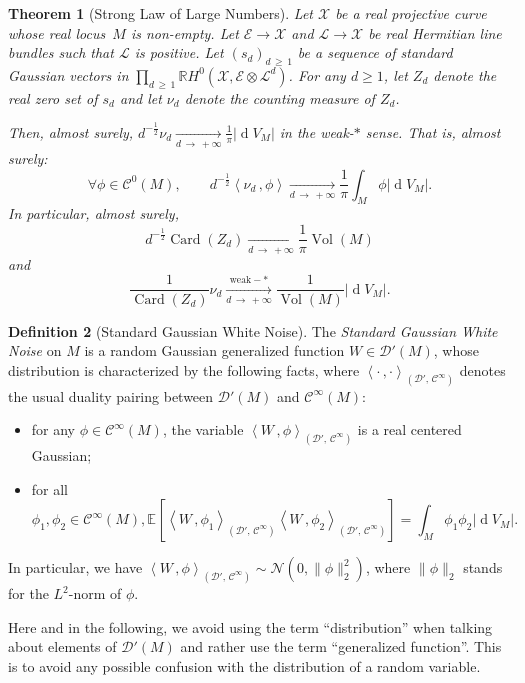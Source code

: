 \documentclass[10pt]{amsart}
\newtheorem{theo}{Theorem}[section]
\theoremstyle{definition}\newtheorem{defi}[theo]{Definition}\newtheorem{rema}[theo]{Remark}\newtheorem{exam}[theo]{Example}\newtheorem{exem}[theo]{Example}\newtheorem{nota}[theo]{Notation}
\DeclareMathOperator{\card}{Card}
\DeclareMathOperator{\dmesure}{d}
\DeclareMathOperator{\Vol}{Vol}
\newcommand{\D}{\mathcal{D}}
\newcommand{\E}{\mathcal{E}}
\newcommand{\X}{\mathcal{X}}
\renewcommand{\L}{\mathcal{L}}
\newcommand{\clN}{\mathcal{N}}
\newcommand{\clC}{\mathcal{C}}
\newcommand{\R}{\mathbb{R}}
\newcommand{\esp}[2][]{\mathbb{E}_{#1}\!\left[#2 \right]}
\newcommand{\norm}[1]{\left\lvert #1 \right\rvert}
\newcommand{\prsc}[2]{\left\langle #1\,, #2 \right\rangle}
\newcommand{\rmes}[1]{\norm{\dmesure\! V_{#1}}}
\newcommand{\vol}[1]{\Vol\!\left(#1\right)}
\renewcommand{\H}{H^0(\X,\E \otimes \L^d)}
\renewcommand{\geq}{\geqslant}
\let\oldforall\forall
\renewcommand*{\forall}{\mathrel{\oldforall}}
\begin{document}
\begin{theo}[{Strong Law of Large Numbers}]\label{thm law of large numbers}
Let $\X$ be a real projective curve whose real locus~$M$ is non-empty. Let $\E \to \X$ and $\L \to \X$ be real Hermitian line bundles such that $\L$ is positive. Let $(s_d)_{d\,\geq\,1}$ be a sequence of standard Gaussian vectors in $\prod_{d\, \geq\,1}\R \H$. For any $d \geq 1$, let $Z_d$ denote the real zero set of $s_d$ and let $\nu_d$ denote the counting measure of $Z_d$.

Then, almost surely, $d^{-\frac{1}{2}}\nu_d \xrightarrow[d\,\to\,+\infty]{} \frac{1}{\pi}\rmes{M}$ in the weak-$*$ sense. That is, almost surely:
\[
\forall \phi \in \clC^0(M), \qquad d^{-\frac{1}{2}}\prsc{\nu_d}{\phi} \xrightarrow[d\,\to\,+\infty]{} \frac{1}{\pi} \int_M \phi \rmes{M}.
\]
In particular, almost surely, 
\[
d^{-\frac{1}{2}}\card(Z_d) \xrightarrow[d\,\to\,+\infty]{} \frac{1}{\pi}\vol{M} 
\]
and
\[
\frac{1}{\card(Z_d)}\nu_d \xrightarrow[d \,\to\,+\infty]{\text{weak}-*} \frac{1}{\Vol(M)}\rmes{M}.
\]
\end{theo}


\begin{defi}[{Standard Gaussian White Noise}]\label{def W}
The \emph{Standard Gaussian White Noise} on $M$ is a random Gaussian generalized function $W \in \D'(M)$, whose distribution is characterized by the following facts, where $\prsc{\cdot}{\cdot}_{(\D',\,\clC^\infty)}$ denotes the usual duality pairing between $\D'(M)$ and $\clC^\infty(M)$:
\begin{itemize}
\item for any $\phi \in \clC^\infty(M)$, the variable $\prsc{W}{\phi}_{(\D',\,\clC^\infty)}$ is a real centered Gaussian;
\item for all 
\[
\phi_1,\phi_2 \in \clC^\infty(M), \esp{\prsc{W}{\phi_1}_{\left(\D',\,\clC^\infty\right)}\prsc{W}{\phi_2}_{\left(\D',\,\clC^\infty\right)}}= \int_M \phi_1 \phi_2 \rmes{M}.
\]
\end{itemize}
In particular, we have $\prsc{W}{\phi}_{(\D',\,\clC^\infty)} \sim \clN(0,\|\phi\|^2_2)$, where $\|\phi\|_2$ stands for the $L^2$-norm of $\phi$.
\end{defi}

Here and in the following, we avoid using the term ``distribution'' when talking about elements of $\D'(M)$ and rather use the term ``generalized function''. This is to avoid any possible confusion with the distribution of a random variable.
\end{document}
